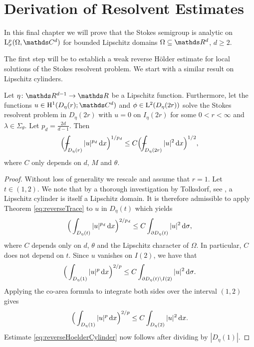 \chapter{Derivation of Resolvent Estimates}

In this final chapter we will prove that the Stokes semigroup is analytic on $\Ell^p_\sigma(\Omega, \C^d)$ for bounded Lipschitz domains $\Omega \subseteq \R^d$, $d \geq 2$.

The first step will be to establich a weak reverse H\"older estimate for local solutions of the Stokes resolvent problem. 
We start with a similar result on Lipschitz cylinders.

\begin{lem}
  \label{lem:reverseHoelderCylinder}
  Let $\eta \colon \R^{d - 1} \to \R$ be a Lipschitz function.
  Furthermore, let the functions $u \in \HH^1(D_\eta(r); \C^d)$ and $\phi \in \mathrm{L}^2(D_\eta(2r))$ solve the Stokes resolvent problem in $D_\eta(2r)$ with $u = 0$ on $I_\eta(2r)$ for some $0 < r < \infty$ and $\lambda \in \Sigma_\theta$.
  Let $p_d = \frac{2d}{d - 1}$.
  Then 
  \begin{align}
    \label{eq:reverseHoelderCylinder}
    \Big( \dashint_{D_\eta(r)} |u|^{p_d} \d x \Big)^{1/p_d} \leq C \Big( \dashint_{D_\eta(2r)} |u|^2 \d x \Big)^{1/2},
  \end{align}
  where $C$ only depends on $d$, $M$ and $\theta$.
\end{lem}

\begin{proof}
  Without loss of generality we rescale and assume that $r = 1$.
  Let $t \in (1,2)$. 
  We note that by a thorough investigation by Tolksdorf, see \cite[Lemma 1.3.25]{tolksdorf}, a Lipschitz cylinder is itself a Lipschitz domain.
  It is therefore admissible to apply Theorem \ref{eq:reverseTrace} to $u$ in $D_\eta(t)$ which yields
  \begin{align*}
    \Big( \int_{D_\eta(t)} |u|^{p_d} \, {\operatorname{d}\!{x}} \Big)^{2/p_d} \leq C \int_{\partial D_\eta(t)} |u|^2 \, {\operatorname{d}\!{\sigma}},
  \end{align*}
  where $C$ depends only on $d$, $\theta$ and the Lipschitz character of $\Omega$. In particular, $C$ does not depend on $t$.
  Since $u$ vanishes on $I(2)$, we have that
  \begin{align*}
    \Big( \int_{D_\eta(1)} |u|^p \, {\operatorname{d}\!{x}} \Big)^{2/p} \leq C \int_{\partial D_\eta(t) \setminus I(2)} |u|^2 \, {\operatorname{d}\!{\sigma}}.
  \end{align*}
  Applying the co-area formula to integrate both sides over the interval $(1,2)$ gives
  \begin{align*}
    \Big( \int_{D_\eta(1)} |u|^p \, {\operatorname{d}\!{x}} \Big)^{2/p} \leq C \int_{D_\eta(2)} |u|^2 \, {\operatorname{d}\!{x}}.
  \end{align*}
  Estimate \eqref{eq:reverseHoelderCylinder} now follows after dividing by $|D_\eta(1)|$.
\end{proof}

